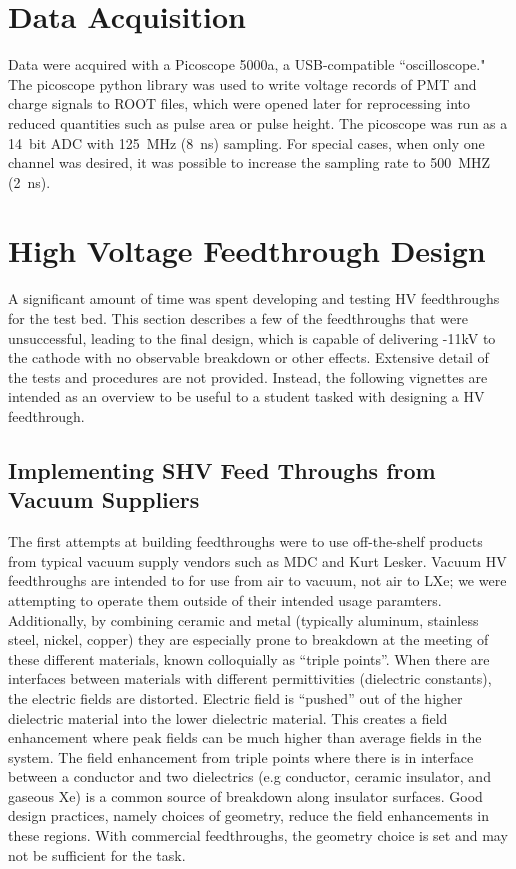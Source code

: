 \section{Data Acquisition}
Data were acquired with a Picoscope 5000a, a USB-compatible ``oscilloscope." The picoscope python library was used to write voltage records of PMT and charge signals to ROOT files, which were opened later for reprocessing into reduced quantities such as pulse area or pulse height. The picoscope was run as a 14~bit ADC with 125~MHz (8~ns) sampling. For special cases, when only one channel was desired, it was possible to increase the sampling rate to 500~MHZ (2~ns). 


\section{High Voltage Feedthrough Design}
A significant amount of time was spent developing and testing \ac{HV} feedthroughs for the test bed. This section describes a few of the feedthroughs that were unsuccessful, leading to the final design, which is capable of delivering -11kV to the cathode with no observable breakdown or other effects. Extensive detail of the tests and procedures are not provided. Instead, the following vignettes are intended as an overview to be useful to a student tasked with designing a HV feedthrough. 

\subsection{Implementing SHV Feed Throughs from Vacuum Suppliers}
The first attempts at building feedthroughs were to use off-the-shelf products from typical vacuum supply vendors such as MDC and Kurt Lesker. Vacuum \ac{HV} feedthroughs are intended to for use from air to vacuum, not air to \ac{LXe}; we were attempting to operate them outside of their intended usage paramters. Additionally, by combining ceramic and metal (typically aluminum, stainless steel, nickel, copper) they are especially prone to breakdown at the meeting of these different materials, known colloquially as ``triple points''. When there are interfaces between materials with different permittivities (dielectric constants), the electric fields are distorted. Electric field is ``pushed'' out of the higher dielectric material into the lower dielectric material. This creates a field enhancement where peak fields can be much higher than average fields in the system. The field enhancement from triple points where there is in interface between a conductor and two dielectrics (e.g conductor, ceramic insulator, and gaseous Xe) is a common source of breakdown along insulator surfaces. Good design practices, namely choices of geometry, reduce the field enhancements in these regions. With commercial feedthroughs, the geometry choice is set and may not be sufficient for the task.

